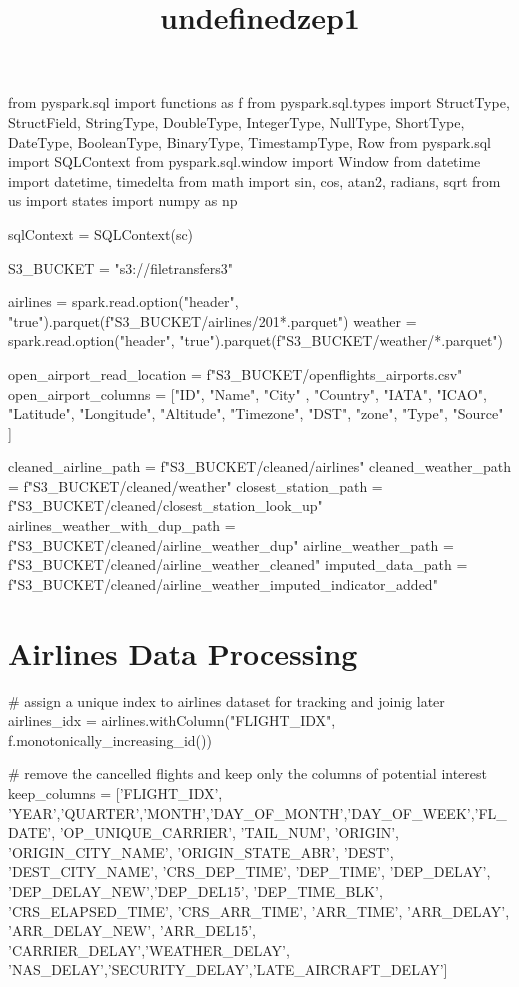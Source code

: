 \documentclass[11pt]{article}
\title{undefinedzep1}
\begin{document}
    
    \maketitle
    
    

from pyspark.sql import functions as f
from pyspark.sql.types import StructType, StructField, StringType, DoubleType, IntegerType, NullType, ShortType, DateType, BooleanType, BinaryType, TimestampType, Row
from pyspark.sql import SQLContext
from pyspark.sql.window import Window
from datetime import datetime, timedelta
from math import sin, cos, atan2, radians, sqrt
from us import states
import numpy as np

sqlContext = SQLContext(sc)

S3_BUCKET  = "s3://filetransfers3"

airlines = spark.read.option("header", "true").parquet(f"{S3_BUCKET}/airlines/201*.parquet")
weather = spark.read.option("header", "true").parquet(f"{S3_BUCKET}/weather/*.parquet")

open_airport_read_location = f"{S3_BUCKET}/openflights_airports.csv"
open_airport_columns = ["ID", "Name", "City" , "Country", "IATA", "ICAO", 
                        "Latitude", "Longitude", "Altitude", "Timezone", "DST", "zone", "Type", "Source" ]

cleaned_airline_path = f"{S3_BUCKET}/cleaned/airlines"
cleaned_weather_path = f"{S3_BUCKET}/cleaned/weather"
closest_station_path = f"{S3_BUCKET}/cleaned/closest_station_look_up"
airlines_weather_with_dup_path = f"{S3_BUCKET}/cleaned/airline_weather_dup"
airline_weather_path = f"{S3_BUCKET}/cleaned/airline_weather_cleaned"
imputed_data_path = f"{S3_BUCKET}/cleaned/airline_weather_imputed_indicator_added"
    \hypertarget{airlines-data-processing}{%
\section{Airlines Data Processing}\label{airlines-data-processing}}

# assign a unique index to airlines dataset for tracking and joinig later
airlines_idx = airlines.withColumn("FLIGHT_IDX", f.monotonically_increasing_id())

# remove the cancelled flights and keep only the columns of potential interest
keep_columns = ['FLIGHT_IDX', 'YEAR','QUARTER','MONTH','DAY_OF_MONTH','DAY_OF_WEEK','FL_DATE', 'OP_UNIQUE_CARRIER', 'TAIL_NUM', 
                'ORIGIN', 'ORIGIN_CITY_NAME', 'ORIGIN_STATE_ABR', 'DEST', 'DEST_CITY_NAME', 
                'CRS_DEP_TIME', 'DEP_TIME', 'DEP_DELAY', 'DEP_DELAY_NEW','DEP_DEL15', 'DEP_TIME_BLK', 'CRS_ELAPSED_TIME', 
                'CRS_ARR_TIME', 'ARR_TIME', 'ARR_DELAY', 'ARR_DELAY_NEW', 'ARR_DEL15', 'CARRIER_DELAY','WEATHER_DELAY', 'NAS_DELAY','SECURITY_DELAY','LATE_AIRCRAFT_DELAY']
\end{document}
